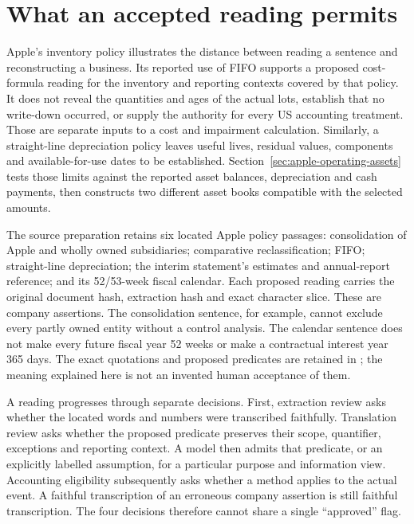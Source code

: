\section{What an accepted reading permits}
\label{sec:source-admission}

Apple's inventory policy illustrates the distance between reading a sentence
and reconstructing a business. Its reported use of FIFO supports a proposed
cost-formula reading for the inventory and reporting contexts covered by that
policy. It does not reveal the quantities and ages of the actual lots, establish
that no write-down occurred, or supply the authority for every US accounting
treatment. Those are separate inputs to a cost and impairment calculation.
Similarly, a straight-line depreciation policy leaves useful lives, residual
values, components and available-for-use dates to be established.
Section~\ref{sec:apple-operating-assets} tests those limits against the reported
asset balances, depreciation and cash payments, then constructs two different
asset books compatible with the selected amounts.

The source preparation retains six located Apple policy passages: consolidation
of Apple and wholly owned subsidiaries; comparative reclassification; FIFO;
straight-line depreciation; the interim statement's estimates and annual-report
reference; and its 52/53-week fiscal calendar. Each proposed reading carries
the original document hash, extraction hash and exact character slice. These
are company assertions. The consolidation sentence, for example, cannot exclude
every partly owned entity without a control analysis. The calendar sentence
does not make every future fiscal year 52 weeks or make a contractual interest
year 365 days. The exact quotations and proposed predicates are retained in
; the meaning explained here is
not an invented human acceptance of them.

A reading progresses through separate decisions. First, extraction review asks
whether the located words and numbers were transcribed faithfully. Translation
review asks whether the proposed predicate preserves their scope, quantifier,
exceptions and reporting context. A model then admits that predicate, or an
explicitly labelled assumption, for a particular purpose and information view.
Accounting eligibility subsequently asks whether a method applies to the actual
event. A faithful transcription of an erroneous company assertion is still
faithful transcription. The four decisions therefore cannot share a single
``approved'' flag.

